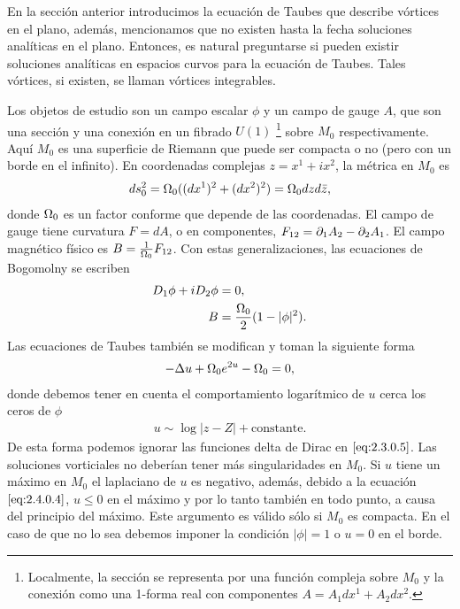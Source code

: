 En la sección anterior introducimos la ecuación de Taubes que describe vórtices en el plano, además, mencionamos que no existen hasta la fecha soluciones analíticas en el plano. Entonces, es natural preguntarse si pueden existir soluciones analíticas en espacios curvos para la ecuación de Taubes. Tales vórtices, si existen, se llaman vórtices integrables.

Los objetos de estudio son un campo escalar $\phi$ y un campo de gauge $A$, que son una sección y una conexión en un fibrado $U(1)$ \footnote{Localmente, la sección se representa por una función compleja sobre $M_0$ y la conexión como una 1-forma real con componentes $A=A_1dx^1+A_2dx^2$.} sobre $M_0$ respectivamente. Aquí $M_0$ es una superficie de Riemann que puede ser compacta o no (pero con un borde en el infinito). En coordenadas complejas $z=x^1+ix^2$, la métrica en $M_0$ es
\begin{align}
    ds_0^2 = \Omega_0((dx^1)^2+(dx^2)^2)=\Omega_0 dzd\bar z, \label{2.4.0.1}
\end{align}
donde $\Omega_0$ es un factor conforme que depende de las coordenadas. El campo de gauge tiene curvatura $F=dA$, o en componentes, $F_{12}=\partial_1 A_2-\partial_2 A_1$. El campo magnético físico es $B=\frac{1}{\Omega_0}F_{12}$. Con estas generalizaciones, las ecuaciones de Bogomolny se escriben
\begin{align}
    D_1\phi+iD_2\phi &= 0, \label{2.4.0.2}\\
    B &= \frac{\Omega_0}{2}(1-|\phi|^2).\label{2.4.0.3}
\end{align}
Las ecuaciones de Taubes también se modifican y toman la siguiente forma
\begin{align}
    -\Delta u+\Omega_0 e^{2u}-\Omega_0 =0, \label{eq:2.4.0.4}
\end{align}
donde debemos tener en cuenta el comportamiento logarítmico de $u$ cerca los ceros de $\phi$
\begin{align}
    u\sim \log |z-Z|+\text{constante}. \label{eq:2.4.0.5}
\end{align}
De esta forma podemos ignorar las funciones delta de Dirac en $\eqref{eq:2.3.0.5}$. Las soluciones vorticiales no deberían tener más singularidades en $M_0$. Si $u$ tiene un máximo en $M_0$ el laplaciano de $u$ es negativo, además, debido a la ecuación $\eqref{eq:2.4.0.4}$, $u\leq 0$ en el máximo y por lo tanto también en todo punto, a causa del principio del máximo. Este argumento es válido sólo si $M_0$ es compacta. En el caso de que no lo sea debemos imponer la condición $|\phi|=1$ o $u=0$ en el borde.

